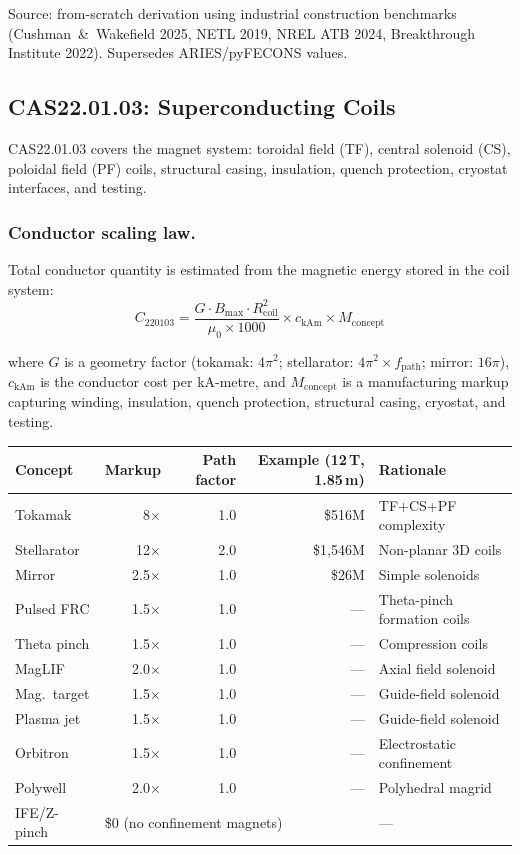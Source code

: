 \documentclass{article}
\begin{document}
Source: from-scratch derivation using industrial construction
benchmarks (Cushman~\&~Wakefield 2025, NETL 2019, NREL ATB 2024,
Breakthrough Institute 2022).  Supersedes ARIES/pyFECONS values.


\subsection{CAS22.01.03: Superconducting Coils}
\label{sec:cas2203}

CAS22.01.03 covers the magnet system: toroidal field (TF), central
solenoid (CS), poloidal field (PF) coils, structural casing,
insulation, quench protection, cryostat interfaces, and testing.

\subsubsection{Conductor scaling law.}
Total conductor quantity is estimated from the magnetic energy stored
in the coil system:
\begin{equation}
\label{eq:cas2203}
C_{220103} = \frac{G \cdot B_{\max} \cdot R_{\text{coil}}^2}
                   {\mu_0 \times 1000}
             \times c_{\text{kAm}}
             \times M_{\text{concept}}
\end{equation}

\noindent where $G$ is a geometry factor (tokamak: $4\pi^2$;
stellarator: $4\pi^2 \times f_{\text{path}}$; mirror: $16\pi$),
$c_{\text{kAm}}$ is the conductor cost per kA-metre, and
$M_{\text{concept}}$ is a manufacturing markup capturing winding,
insulation, quench protection, structural casing, cryostat, and testing.

\begin{center}
\begin{tabular}{lrrrl}
\toprule
Concept & Markup & Path factor & Example (12\,T, 1.85\,m) & Rationale \\
\midrule
Tokamak     &  8$\times$ & 1.0 & \$516M & TF+CS+PF complexity \\
Stellarator & 12$\times$ & 2.0 & \$1{,}546M & Non-planar 3D coils \\
Mirror      &  2.5$\times$ & 1.0 & \$26M & Simple solenoids \\
Pulsed FRC  &  1.5$\times$ & 1.0 & --- & Theta-pinch formation coils \\
Theta pinch &  1.5$\times$ & 1.0 & --- & Compression coils \\
MagLIF      &  2.0$\times$ & 1.0 & --- & Axial field solenoid \\
Mag.\ target &  1.5$\times$ & 1.0 & --- & Guide-field solenoid \\
Plasma jet  &  1.5$\times$ & 1.0 & --- & Guide-field solenoid \\
Orbitron    &  1.5$\times$ & 1.0 & --- & Electrostatic confinement \\
Polywell    &  2.0$\times$ & 1.0 & --- & Polyhedral magrid \\
IFE/Z-pinch & \multicolumn{3}{l}{\$0 (no confinement magnets)} & --- \\
\bottomrule
\end{tabular}
\end{center}
\end{document}
